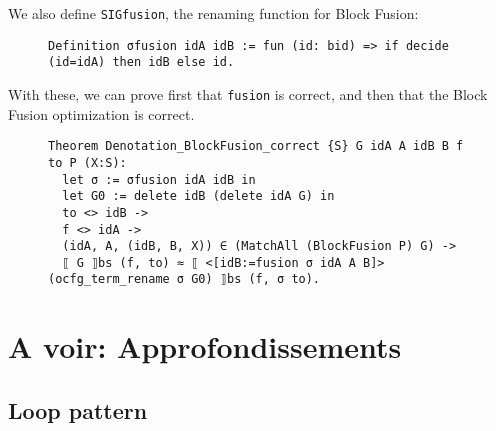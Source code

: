 \documentclass[11pt]{article}
\newcommand{\inlinecoq}[1]{\mbox{\lstinline[style=customcoq,columns=fixed,basewidth=.48em]{#1}}}
\newcommand{\ilc}[1]{\inlinecoq{#1}}
\begin{document}
We also define \ilc{SIGfusion}, the renaming function for Block Fusion:

\begin{figure}[H]
  \begin{lstlisting}[style=customcoq,basicstyle=\small\ttfamily]
Definition σfusion idA idB := fun (id: bid) => if decide (id=idA) then idB else id.
  \end{lstlisting}
\end{figure}

With these, we can prove first that \ilc{fusion} is correct, and then that the Block Fusion optimization is correct.

\begin{figure}[H]
  \begin{lstlisting}[style=customcoq,basicstyle=\small\ttfamily]
Theorem Denotation_BlockFusion_correct {S} G idA A idB B f to P (X:S):
  let σ := σfusion idA idB in
  let G0 := delete idB (delete idA G) in
  to <> idB ->
  f <> idA ->
  (idA, A, (idB, B, X)) ∈ (MatchAll (BlockFusion P) G) ->
  ⟦ G ⟧bs (f, to) ≈ ⟦ <[idB:=fusion σ idA A B]> (ocfg_term_rename σ G0) ⟧bs (f, σ to).
      \end{lstlisting}
\end{figure}

\section{A voir: Approfondissements}
\label{sec:appr}

\subsection{Loop pattern}



\end{document}
